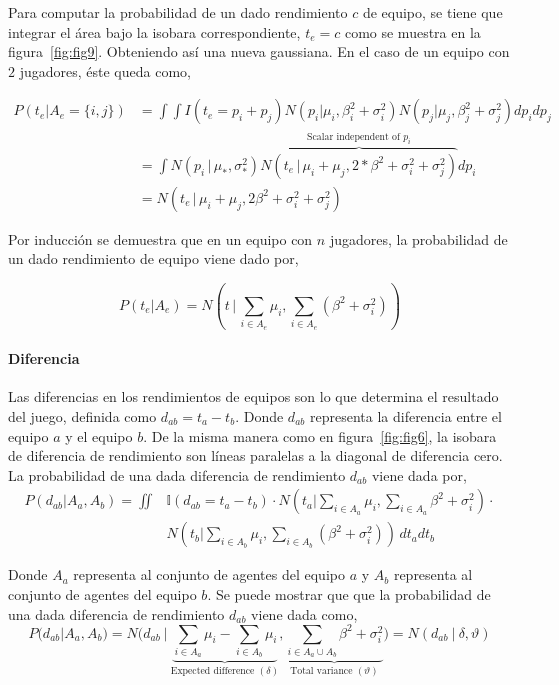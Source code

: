 \documentclass[11pt,twoside,spanish]{report} %
\begin{document}
Para computar la probabilidad de un dado rendimiento $c$ de equipo, se tiene que integrar el \'area bajo la isobara correspondiente, $ t_e = c $ como se muestra en la figura~\ref{fig:fig9}.
Obteniendo as\'i una nueva gaussiana.
En el caso de un equipo con $2$ jugadores, \'este queda como,


\begin{equation}
\begin{split}
P(t_e|A_e=\{i,j\}) & =\int\int I(t_e=p_i+p_j)N(p_i \vert \mu_i,\beta_i^2+\sigma_i^2)N(p_j \vert \mu_j,\beta_j^2+\sigma_j^2)dp_idp_j\\
  & = \int N(p_i\,|\,\mu_{*},\sigma_{*}^2) \overbrace{N(t_e\,|\,\mu_i+\mu_j,2*\beta^2 + \sigma_i^2 + \sigma_j^2)}^{\text{Scalar independent of $p_i$}} dp_i \\[0.3cm]
& = N(t_e \,|\, \mu_i+\mu_j,2\beta^2 + \sigma_i^2 + \sigma_j^2)
\end{split}
\end{equation}

Por inducci\'on se demuestra que en un equipo con $n$ jugadores, la probabilidad de un dado rendimiento de equipo viene dado por,

\begin{equation}
P(t_e|A_e) = N\left(t\,|\,\sum_{i\in A_e} \mu_i,\sum_{i\in A_e} (\beta^2 + \sigma_i^2)\right)
\end{equation}

\paragraph{Diferencia}

Las diferencias en los rendimientos de equipos son lo que determina el resultado del juego, definida como $d_{ab}=t_a - t_b$.
Donde $d_{ab}$ representa la diferencia entre el equipo $a$ y el equipo $b$.
De la misma manera como en figura~\ref{fig:fig6}, la isobara de diferencia de rendimiento son l\'ineas paralelas a la diagonal de diferencia cero.
La probabilidad de una dada diferencia de rendimiento $d_ {ab}$ viene dada por,
\begin{align}\label{eq:mensajeCum}
P(d_{ab}|A_a,A_b) = \iint & \mathbb{I}(d_{ab}=t_a -t_b)\cdot N(t_a|\sum_{i\in A_a} \mu_i,\sum_{i\in A_a} \beta^2 + \sigma_i^2) \cdot \nonumber \\
& N(t_b|\sum_{i\in A_b} \mu_i,\sum_{i\in A_b} (\beta^2 + \sigma_i^2)) \, dt_a dt_b
\end{align}

Donde $A_a$ representa al conjunto de agentes del equipo $a$ y $A_b$ representa al conjunto de agentes del equipo $b$.
Se puede mostrar que que la probabilidad de una dada diferencia de rendimiento $d_ {ab} $ viene dada como,
\begin{equation}\label{eq:proba_handicap}
P(d_{ab}|A_a,A_b) = N\Bigg(d_{ab} \ | \  \underbrace{\sum_{i\in A_a} \mu_i - \sum_{i\in A_b} \mu_i}_{\text{Expected difference }(\delta)},\underbrace{\sum_{i\in A_a\cup A_b} \beta^2 + \sigma_i^2}_{\text{Total variance }(\vartheta)}\Bigg) = N(d_{ab} \ | \  \delta, \vartheta )
\end{equation}
\end{document}
